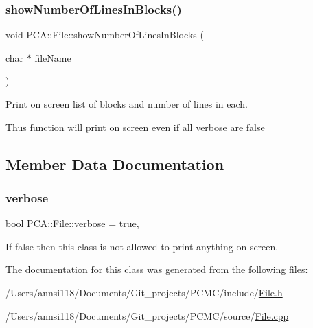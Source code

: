 \subsubsection{\texorpdfstring{show\+Number\+Of\+Lines\+In\+Blocks()}{showNumberOfLinesInBlocks()}}
{\footnotesize\ttfamily void P\+C\+A\+::\+File\+::show\+Number\+Of\+Lines\+In\+Blocks (\begin{DoxyParamCaption}\item[{char $\ast$}]{file\+Name }\end{DoxyParamCaption})\hspace{0.3cm}{\ttfamily [static]}}



Print on screen list of blocks and number of lines in each. 

Thus function will print on screen even if all verbose are false 

\subsection{Member Data Documentation}
\hypertarget{class_p_c_a_1_1_file_a7d78765563f9be7e1ca260dcd3c65053}{}\label{class_p_c_a_1_1_file_a7d78765563f9be7e1ca260dcd3c65053} 
\subsubsection{\texorpdfstring{verbose}{verbose}}
{\footnotesize\ttfamily bool P\+C\+A\+::\+File\+::verbose = true\hspace{0.3cm}{\ttfamily [static]}, {\ttfamily [private]}}



If false then this class is not allowed to print anything on screen. 



The documentation for this class was generated from the following files\+:\begin{DoxyCompactItemize}
\item 
/\+Users/annsi118/\+Documents/\+Git\+\_\+projects/\+P\+C\+M\+C/include/\hyperlink{_file_8h}{File.\+h}\item 
/\+Users/annsi118/\+Documents/\+Git\+\_\+projects/\+P\+C\+M\+C/source/\hyperlink{_file_8cpp}{File.\+cpp}\end{DoxyCompactItemize}
